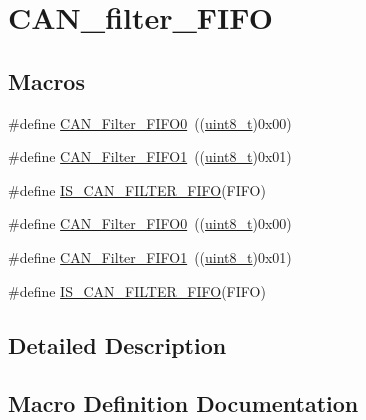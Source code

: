 \hypertarget{group___c_a_n__filter___f_i_f_o}{}\section{C\+A\+N\+\_\+filter\+\_\+\+F\+I\+FO}
\label{group___c_a_n__filter___f_i_f_o}
\subsection*{Macros}
\begin{DoxyCompactItemize}
\item 
\#define \hyperlink{group___c_a_n__filter___f_i_f_o_ga8249c27978ca94676530540b88a6be8f}{C\+A\+N\+\_\+\+Filter\+\_\+\+F\+I\+F\+O0}~((\hyperlink{_p_e___types_8h_aba7bc1797add20fe3efdf37ced1182c5}{uint8\+\_\+t})0x00)
\item 
\#define \hyperlink{group___c_a_n__filter___f_i_f_o_gaab8478c89a607c4b8baf68efc730e316}{C\+A\+N\+\_\+\+Filter\+\_\+\+F\+I\+F\+O1}~((\hyperlink{_p_e___types_8h_aba7bc1797add20fe3efdf37ced1182c5}{uint8\+\_\+t})0x01)
\item 
\#define \hyperlink{group___c_a_n__filter___f_i_f_o_ga2df5ae0de841fc80c969e9147991ec9d}{I\+S\+\_\+\+C\+A\+N\+\_\+\+F\+I\+L\+T\+E\+R\+\_\+\+F\+I\+FO}(F\+I\+FO)
\item 
\#define \hyperlink{group___c_a_n__filter___f_i_f_o_ga8249c27978ca94676530540b88a6be8f}{C\+A\+N\+\_\+\+Filter\+\_\+\+F\+I\+F\+O0}~((\hyperlink{_p_e___types_8h_aba7bc1797add20fe3efdf37ced1182c5}{uint8\+\_\+t})0x00)
\item 
\#define \hyperlink{group___c_a_n__filter___f_i_f_o_gaab8478c89a607c4b8baf68efc730e316}{C\+A\+N\+\_\+\+Filter\+\_\+\+F\+I\+F\+O1}~((\hyperlink{_p_e___types_8h_aba7bc1797add20fe3efdf37ced1182c5}{uint8\+\_\+t})0x01)
\item 
\#define \hyperlink{group___c_a_n__filter___f_i_f_o_ga2df5ae0de841fc80c969e9147991ec9d}{I\+S\+\_\+\+C\+A\+N\+\_\+\+F\+I\+L\+T\+E\+R\+\_\+\+F\+I\+FO}(F\+I\+FO)
\end{DoxyCompactItemize}


\subsection{Detailed Description}


\subsection{Macro Definition Documentation}
